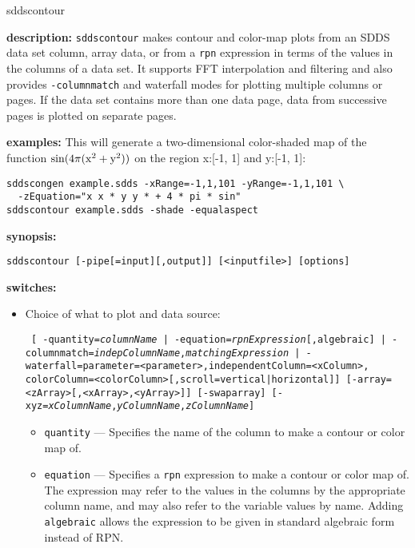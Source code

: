 \begin{sddsprog}{sddscontour}
  \item \textbf{description:}
  \verb|sddscontour| makes contour and color-map plots from an SDDS data set column, array data, or from a \verb|rpn| expression
  in terms of the values in the columns of a data set. It supports FFT interpolation and filtering and also provides
  \verb|-columnmatch| and waterfall modes for plotting multiple columns or pages. If the
  data set contains more than one data page, data from successive pages is plotted on separate pages.

  \item \textbf{examples:}
  This will generate a two-dimensional color-shaded map of the function ${\rm sin(4\pi (x^2 + y^2))}$ on
  the region x:[-1, 1] and y:[-1, 1]:
  \begin{verbatim}
sddscongen example.sdds -xRange=-1,1,101 -yRange=-1,1,101 \
  -zEquation="x x * y y * + 4 * pi * sin"
sddscontour example.sdds -shade -equalaspect
  \end{verbatim}
  \item \textbf{synopsis:}
  \begin{verbatim}
sddscontour [-pipe[=input][,output]] [<inputfile>] [options]
  \end{verbatim}
  \item \textbf{switches:}
    \begin{itemize}
    \item Choice of what to plot and data source:
\begin{flushleft}{\tt
[{ -quantity={\em columnName} | -equation={\em rpnExpression}[,algebraic] |
  -columnmatch={\em indepColumnName},{\em matchingExpression}} |
 -waterfall=parameter=<parameter>,independentColumn=<xColumn>,
             colorColumn=<colorColumn>[,scroll=vertical|horizontal]]
[-array=<zArray>[,<xArray>,<yArray>]] [-swaparray]
[-xyz={\em xColumnName},{\em yColumnName},{\em zColumnName}]
}\end{flushleft}
\begin{itemize}
        \item \verb|quantity| --- Specifies the name of the column to make a contour or color map of.
        \item \verb|equation| --- Specifies a \verb|rpn| expression to make a contour or color map of.
        The expression may refer to the values in the columns by the appropriate column name, and may
        also refer to the variable values by name.  Adding \verb|algebraic| allows the
        expression to be given in standard algebraic form instead of RPN.

\end{itemize}
\end{itemize}
\end{sddsprog}
